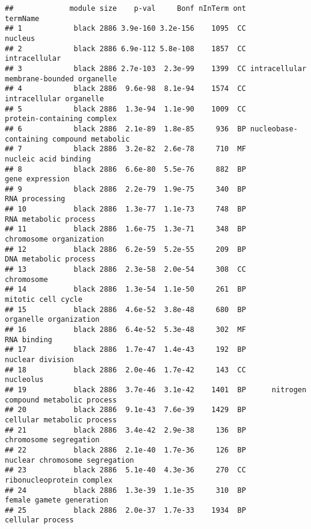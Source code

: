 \documentclass[]{article}
\begin{document}
\begin{verbatim}
##             module size    p-val     Bonf nInTerm ont                                 termName
## 1            black 2886 3.9e-160 3.2e-156    1095  CC                                  nucleus
## 2            black 2886 6.9e-112 5.8e-108    1857  CC                            intracellular
## 3            black 2886 2.7e-103  2.3e-99    1399  CC intracellular membrane-bounded organelle
## 4            black 2886  9.6e-98  8.1e-94    1574  CC                  intracellular organelle
## 5            black 2886  1.3e-94  1.1e-90    1009  CC               protein-containing complex
## 6            black 2886  2.1e-89  1.8e-85     936  BP nucleobase-containing compound metabolic
## 7            black 2886  3.2e-82  2.6e-78     710  MF                     nucleic acid binding
## 8            black 2886  6.6e-80  5.5e-76     882  BP                          gene expression
## 9            black 2886  2.2e-79  1.9e-75     340  BP                           RNA processing
## 10           black 2886  1.3e-77  1.1e-73     748  BP                    RNA metabolic process
## 11           black 2886  1.6e-75  1.3e-71     348  BP                  chromosome organization
## 12           black 2886  6.2e-59  5.2e-55     209  BP                    DNA metabolic process
## 13           black 2886  2.3e-58  2.0e-54     308  CC                               chromosome
## 14           black 2886  1.3e-54  1.1e-50     261  BP                       mitotic cell cycle
## 15           black 2886  4.6e-52  3.8e-48     680  BP                   organelle organization
## 16           black 2886  6.4e-52  5.3e-48     302  MF                              RNA binding
## 17           black 2886  1.7e-47  1.4e-43     192  BP                         nuclear division
## 18           black 2886  2.0e-46  1.7e-42     143  CC                                nucleolus
## 19           black 2886  3.7e-46  3.1e-42    1401  BP      nitrogen compound metabolic process
## 20           black 2886  9.1e-43  7.6e-39    1429  BP               cellular metabolic process
## 21           black 2886  3.4e-42  2.9e-38     136  BP                   chromosome segregation
## 22           black 2886  2.1e-40  1.7e-36     126  BP           nuclear chromosome segregation
## 23           black 2886  5.1e-40  4.3e-36     270  CC                ribonucleoprotein complex
## 24           black 2886  1.3e-39  1.1e-35     310  BP                 female gamete generation
## 25           black 2886  2.0e-37  1.7e-33    1934  BP                         cellular process

\end{verbatim}
\end{document}
